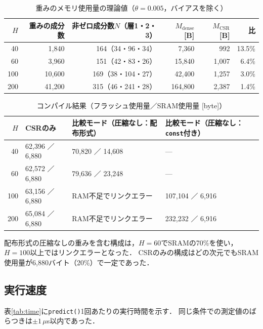 \documentclass[a4paper,11pt,uplatex,dvipdfmx]{jsarticle}
\begin{document}
\begin{table}[H]
  \centering
  \caption{重みのメモリ使用量の理論値（$\theta=0.005$，バイアスを除く）}
  \label{tab:memcalc}
  \begin{tabular}{rrrrrr}
    \toprule
    $H$ & 重みの成分数 & 非ゼロ成分数$N$（層1・2・3） & $M_{\mathrm{dense}}$ [B] & $M_{\mathrm{CSR}}$ [B] & 比 \\
    \midrule
    40  &  1{,}840 & 164（34・96・34）   &   7{,}360 &    992 & 13.5\% \\
    60  &  3{,}960 & 151（42・83・26）   &  15{,}840 & 1{,}007 &  6.4\% \\
    100 & 10{,}600 & 169（38・104・27）  &  42{,}400 & 1{,}257 &  3.0\% \\
    200 & 41{,}200 & 315（46・241・28）  & 164{,}800 & 2{,}387 &  1.4\% \\
    \bottomrule
  \end{tabular}
\end{table}

\begin{table}[H]
  \centering
  \caption{コンパイル結果（フラッシュ使用量／SRAM使用量 [byte]）}
  \label{tab:memcompile}
  \small
  \begin{tabular}{rlll}
    \toprule
    $H$ & CSRのみ & 比較モード（圧縮なし：配布形式） & 比較モード（圧縮なし：\texttt{const}付き） \\
    \midrule
    40  & 62{,}396 ／ 6{,}880 & 70{,}820 ／ 14{,}608 & --- \\
    60  & 62{,}572 ／ 6{,}880 & 79{,}636 ／ 23{,}248 & --- \\
    100 & 63{,}156 ／ 6{,}880 & RAM不足でリンクエラー & 107{,}104 ／ 6{,}916 \\
    200 & 65{,}084 ／ 6{,}880 & RAM不足でリンクエラー & 232{,}232 ／ 6{,}916 \\
    \bottomrule
  \end{tabular}
\end{table}

配布形式の圧縮なしの重みを含む構成は，$H=60$でSRAMの70\%を使い，$H=100$以上ではリンクエラーとなった．
CSRのみの構成はどの次元でもSRAM使用量が6{,}880バイト（20\%）で一定であった．

\subsection{実行速度}
表\ref{tab:time}に\texttt{predict()}1回あたりの実行時間を示す．
同じ条件での測定値のばらつきは$\pm 1\,\mu$s以内であった．
\end{document}
